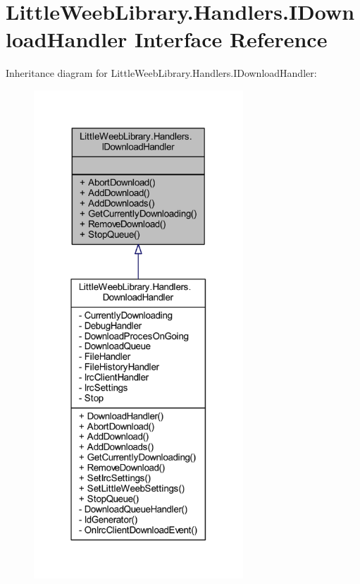 \hypertarget{interface_little_weeb_library_1_1_handlers_1_1_i_download_handler}{}\section{Little\+Weeb\+Library.\+Handlers.\+I\+Download\+Handler Interface Reference}
\label{interface_little_weeb_library_1_1_handlers_1_1_i_download_handler}


Inheritance diagram for Little\+Weeb\+Library.\+Handlers.\+I\+Download\+Handler\+:\nopagebreak
\begin{figure}[H]
\begin{center}
\leavevmode
\includegraphics[width=223pt]{interface_little_weeb_library_1_1_handlers_1_1_i_download_handler__inherit__graph}
\end{center}
\end{figure}


